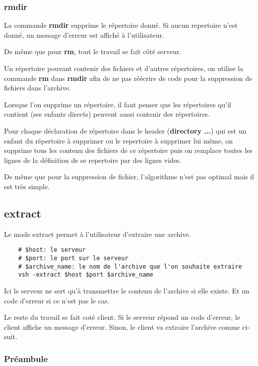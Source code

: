 \documentclass[titlepage]{article}
\begin{document}
	\subsubsection{rmdir}

	La commande \textbf{rmdir} supprime le répertoire donné. Si aucun repertoire n'est donné, un message d'erreur est affiché à l'utilisateur.

	De même que pour \textbf{rm}, tout le travail se fait côté serveur.

	Un répertoire pouvant contenir des fichiers et d'autres répertoires, on utilise la commande \textbf{rm} dans \textbf{rmdir} afin de ne pas réécrire de code pour la suppression de fichiers dans l'archive.

	Lorsque l'on supprime un répertoire, il faut penser que les répertoires qu'il contient (ses enfants directs) peuvent aussi contenir des répertoires. 

	Pour chaque déclaration de répertoire dans le header (\textbf{directory ...}) qui est un enfant du répertoire à supprimer ou le repertoire à supprimer lui même, on supprime tous les contenu des fichiers de ce répertoire puis on remplace toutes les lignes de la définition de se repertoire par des lignes vides.

	De même que pour la suppression de fichier, l'algorithme n'est pas optimal mais il est très simple.  

	\subsection{extract}

	Le mode extract permet à l’utilisateur d’extraire une archive. 

	\begin{lstlisting}
	# $host: le serveur
	# $port: le port sur le serveur
	# $archive_name: le nom de l'archive que l'on souhaite extraire
	vsh -extract $host $port $archive_name
	\end{lstlisting}

	Ici le serveur ne sert qu’à transmettre le contenu de l’archive si elle existe. Et un code d’erreur si ce n’est pas le cas. 

	Le reste du travail se fait coté client. Si le serveur répond un code d’erreur, le client affiche un message d’erreur. Sinon, le client va extraire l’archive comme ci-suit.

	\subsubsection{Préambule}
\end{document}
